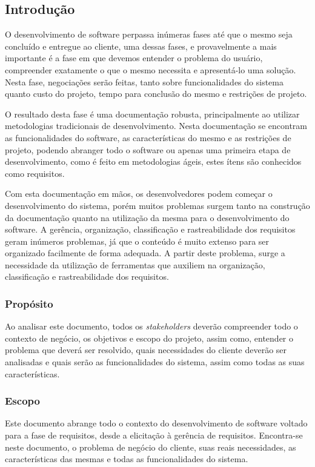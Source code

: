 \subsection{Introdução}

O desenvolvimento de software perpassa inúmeras fases até que o mesmo seja concluído e entregue ao cliente, uma dessas fases, e provavelmente a mais importante é a fase em que devemos entender o problema do usuário, compreender exatamente o que o mesmo necessita e apresentá-lo uma solução. Nesta fase, negociações serão feitas, tanto sobre funcionalidades do sistema quanto custo do projeto, tempo para conclusão do mesmo e restrições de projeto.

O resultado desta fase é uma documentação robusta, principalmente ao utilizar metodologias tradicionais de desenvolvimento. Nesta documentação se encontram as funcionalidades do software, as características do mesmo e as restrições de projeto, podendo abranger todo o software ou apenas uma primeira etapa de desenvolvimento, como é feito em metodologias ágeis, estes ítens são conhecidos como requisitos.

Com esta documentação em mãos, os desenvolvedores podem começar o desenvolvimento do sistema, porém muitos problemas surgem tanto na construção da documentação quanto na utilização da mesma para o desenvolvimento do software. A gerência, organização, classificação e rastreabilidade dos requisitos geram inúmeros problemas, já que o conteúdo é muito extenso para ser organizado facilmente de forma adequada. A partir deste problema, surge a necessidade da utilização de ferramentas que auxiliem na organização, classificação e rastreabilidade dos requisitos.

\subsubsection{Propósito}

Ao analisar este documento, todos os \textit{stakeholders} deverão compreender todo o contexto de negócio, os objetivos e escopo do projeto, assim como, entender o problema que deverá ser resolvido, quais necessidades do cliente deverão ser analisadas e quais serão as funcionalidades do sistema, assim como todas as suas características.

\subsubsection{Escopo}

Este documento abrange todo o contexto do desenvolvimento de software voltado para a fase de requisitos, desde a elicitação à gerência de requisitos. Encontra-se neste documento, o problema de negócio do cliente, suas reais necessidades, as características das mesmas e todas as funcionalidades do sistema.

